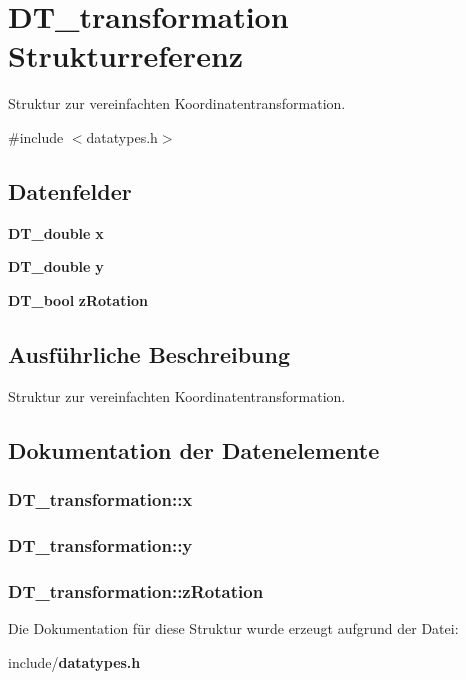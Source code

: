 \section{DT\_\-transformation Strukturreferenz}
\label{struct_d_t__transformation}


Struktur zur vereinfachten Koordinatentransformation.  




{\ttfamily \#include $<$datatypes.h$>$}

\subsection*{Datenfelder}
\begin{DoxyCompactItemize}
\item 
{\bf DT\_\-double} {\bf x}
\item 
{\bf DT\_\-double} {\bf y}
\item 
{\bf DT\_\-bool} {\bf zRotation}
\end{DoxyCompactItemize}


\subsection{Ausführliche Beschreibung}
Struktur zur vereinfachten Koordinatentransformation. 

\subsection{Dokumentation der Datenelemente}
\subsubsection[{x}]{ {\bf DT\_\-transformation::x}}\label{struct_d_t__transformation_a8cbecb0dc8d898e32bb8f4bc8572d197}
\subsubsection[{y}]{ {\bf DT\_\-transformation::y}}\label{struct_d_t__transformation_acfd9d3dd1f5f8a72ceb38b014182750c}
\subsubsection[{zRotation}]{ {\bf DT\_\-transformation::zRotation}}\label{struct_d_t__transformation_a8135e9b922843ab0aed6d0055fd69afa}


Die Dokumentation für diese Struktur wurde erzeugt aufgrund der Datei:\begin{DoxyCompactItemize}
\item 
include/{\bf datatypes.h}\end{DoxyCompactItemize}

